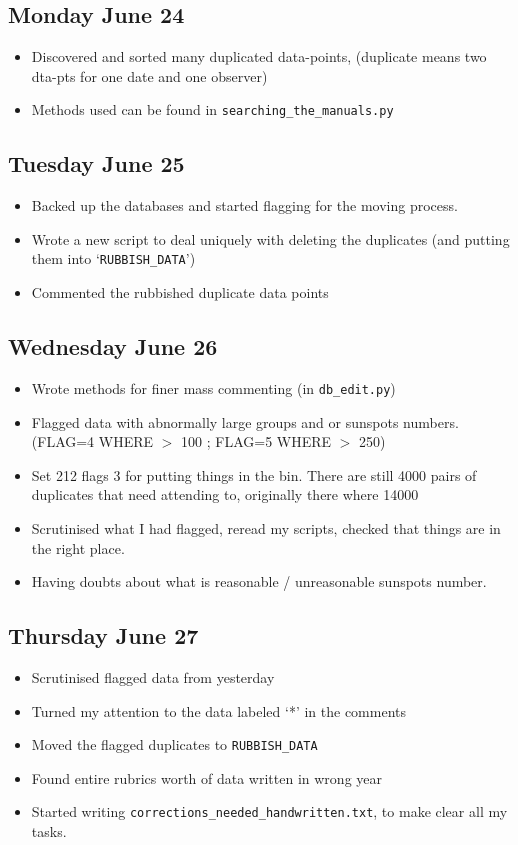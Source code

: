\documentclass[12pt]{article}
\begin{document}
\subsection{Monday June 24}
\begin{itemize}
    \item Discovered and sorted many duplicated data-points, (duplicate means two dta-pts for one date and one observer)
    \item Methods used can be found in \texttt{searching\_the\_manuals.py}
\end{itemize}
    
\subsection{Tuesday June 25}
\begin{itemize}
    \item Backed up the databases and started flagging for the moving process.
    \item Wrote a new script to deal uniquely with deleting the duplicates (and putting them into `\texttt{RUBBISH\_DATA}')
    \item Commented the rubbished duplicate data points
\end{itemize}
    
\subsection{Wednesday June 26}
\begin{itemize}
    \item Wrote methods for finer mass commenting (in \texttt{db\_edit.py})
    \item Flagged data with abnormally large groups and or sunspots numbers. (FLAG=4 WHERE $>$ 100 ; FLAG=5 WHERE $>$ 250)
    \item Set 212 flags 3 for putting things in the bin. There are still 4000 pairs of duplicates that need attending to, originally there where 14000
    \item Scrutinised what I had flagged, reread my scripts, checked that things are in the right place.
    \item Having doubts about what is reasonable / unreasonable sunspots number.
\end{itemize}
    
\subsection{Thursday June 27}
\begin{itemize}
    \item Scrutinised flagged data from yesterday
    \item Turned my attention to the data labeled `*' in the comments
    \item Moved the flagged duplicates to \texttt{RUBBISH\_DATA}
    \item Found entire rubrics worth of data written in wrong year
    \item Started writing \texttt{corrections\_needed\_handwritten.txt}, to make clear all my tasks.
\end{itemize}
    
\end{document}
